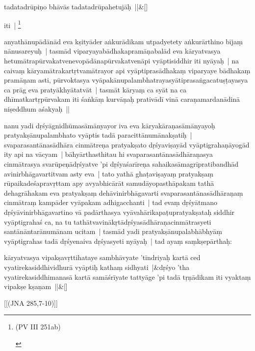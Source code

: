 \documentclass[article,12pt,a4paper]{memoir}
\begin{document}
	    
	    \stanza[\smallbreak]
	tadatadrūpiṇo bhāvās tadatadrūpahetujāḥ ||\&[\smallbreak]


	
	    \pstart
	   iti | \footnote{\begin{english}(PV III 251ab)\end{english}}
	\pend
      

	  \pstart anyathānupādānād eva kṣityāder aṅkurādikam utpadyetety aṅkurārthino bījaṃ nānusareyuḥ | tasmād viparyayabādhakapramāṇabalād eva kāryatvasya hetumātrapūrvakatvenevopādānapūrvakatvenāpi vyāptisiddhir iti nyāyaḥ | na caivaṃ kāryamātrakartṛtvamātrayor api vyāptiprasādhakaṃ viparyaye bādhakaṃ pramāṇam asti, pūrvoktasya vyāpakānupalambhatrayasyātiprasaṅgacatuṣṭayasya ca prāg eva pratyākhyātatvāt | tasmāt kāryaṃ ca syāt na ca dhīmatkartṛpūrvakam iti śaṅkāṃ kurvāṇaḥ prativādī vinā caraṇamardanādinā niṣeddhum aśakyaḥ ||
	\pend
      

	  \pstart nanu yadi dṛśyāgnidhūmasāmānyayor iva  eva kāryakāraṇasāmānyayoḥ pratyakṣānupalambhato vyāptis tadā paracittānumānakṣatiḥ | svaparasantānasādhāra cinmātreṇa pratyakṣato dṛśyaviṣayād vyāptigrahaṇāyogād ity api na vācyam | bāhyārthasthitau hi svaparasantānasādhāraṇasya cinmātrasya svarūpeṇādṛśyatve 'pi dṛśyaśarīreṇa sahaikasāmagrīpratibandhād avinirbhāgavartitvam asty eva | tato yathā ghaṭaviṣayaṃ pratyakṣaṃ rūpaikadeśapravṛttam apy avyabhicārāt samudāyopasthāpakam tathā dehagrāhakam eva pratyakṣaṃ dehāvinirbhāgavarti svaparasantānasādhāraṇaṃ cinmātraṃ kampāder vyāpakam adhigacchanti | tad evaṃ dṛśyātmano dṛśyāvinirbhāgavartino vā padārthasya vyāvahārikapaṭupratyakṣataḥ siddhir vyāptigrahaś ca, na tu tathātvavinākṛtādṛśyasādhāraṇacinmātrasyeti santānāntarānumānam ucitam | tasmād yadi pratyakṣānupalabhābhyāṃ vyāptigrahas tadā dṛśyenaiva dṛśyasyeti nyāyaḥ | \label{thakur75-45.24} tad ayaṃ saṃkṣepārthaḥ:
	\pend
      
	    
	    \stanza[\smallbreak]
	kāryatvasya vipakṣavṛttihataye sambhāvyate 'tīndriyaḥ kartā ced vyatirekasiddhividhurā vyāptiḥ kathaṃ sidhyati |&dṛśyo 'tha vyatirekasiddhimanasā kartā samāśrīyate tattyāge 'pi tadā tṛṇādikam iti vyaktaṃ vipakṣe kṣaṇam ||\&[\smallbreak]


	[[(JNA 285,7-10)]]
\end{document}
